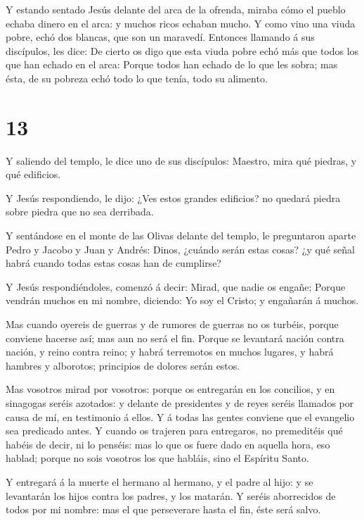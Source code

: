  Y estando sentado Jesús delante del arca de la ofrenda,
miraba cómo el pueblo echaba dinero en el arca: y muchos ricos echaban
mucho.  Y como vino una viuda pobre, echó dos blancas, que
son un maravedí.  Entonces llamando á sus discípulos, les
dice: De cierto os digo que esta viuda pobre echó más que todos los que
han echado en el arca:  Porque todos han echado de lo que
les sobra; mas ésta, de su pobreza echó todo lo que tenía, todo su
alimento.

\hypertarget{section-12}{%
\section{13}\label{section-12}}

 Y saliendo del templo, le dice uno de sus discípulos:
Maestro, mira qué piedras, y qué edificios.

 Y Jesús respondiendo, le dijo: ¿Ves estos grandes
edificios? no quedará piedra sobre piedra que no sea derribada.

 Y sentándose en el monte de las Olivas delante del templo,
le preguntaron aparte Pedro y Jacobo y Juan y Andrés: 
Dinos, ¿cuándo serán estas cosas? ¿y qué señal habrá cuando todas estas
cosas han de cumplirse?

 Y Jesús respondiéndoles, comenzó á decir: Mirad, que nadie
os engañe;  Porque vendrán muchos en mi nombre, diciendo: Yo
soy el Cristo; y engañarán á muchos.

 Mas cuando oyereis de guerras y de rumores de guerras no os
turbéis, porque conviene hacerse así; mas aun no será el fin.
 Porque se levantará nación contra nación, y reino contra
reino; y habrá terremotos en muchos lugares, y habrá hambres y
alborotos; principios de dolores serán estos.

 Mas vosotros mirad por vosotros: porque os entregarán en
los concilios, y en sinagogas seréis azotados: y delante de presidentes
y de reyes seréis llamados por causa de mí, en testimonio á ellos.
 Y á todas las gentes conviene que el evangelio sea
predicado antes.  Y cuando os trajeren para entregaros, no
premeditéis qué habéis de decir, ni lo penséis: mas lo que os fuere dado
en aquella hora, eso hablad; porque no sois vosotros los que habláis,
sino el Espíritu Santo.

 Y entregará á la muerte el hermano al hermano, y el padre
al hijo: y se levantarán los hijos contra los padres, y los matarán.
 Y seréis aborrecidos de todos por mi nombre: mas el que
perseverare hasta el fin, éste será salvo.

